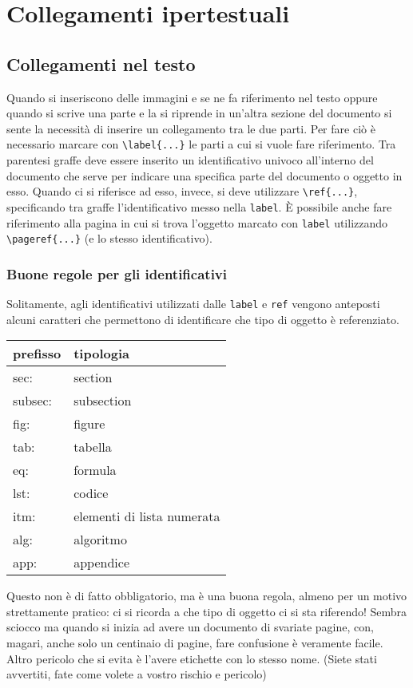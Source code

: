 \section{Collegamenti ipertestuali}

\subsection{Collegamenti nel testo}
Quando si inseriscono delle immagini e se ne fa riferimento nel testo oppure 
quando si scrive una parte e la si riprende in un'altra sezione del documento 
si sente la necessità di inserire un collegamento tra le due parti. Per fare 
ciò è necessario marcare con \verb!\label{...}! le parti a cui si vuole fare 
riferimento. Tra parentesi graffe deve essere inserito un identificativo 
univoco all'interno del documento che serve per indicare una specifica parte 
del documento o oggetto in esso. Quando ci si riferisce ad esso, invece, si 
deve utilizzare \verb!\ref{...}!, specificando tra graffe l'identificativo 
messo nella \verb!label!. È possibile anche fare riferimento alla pagina in 
cui si trova l'oggetto marcato con \verb!label! utilizzando 
\verb!\pageref{...}! (e lo stesso identificativo).

\subsubsection{Buone regole per gli identificativi}
Solitamente, agli identificativi utilizzati dalle \verb!label! e \verb!ref! 
vengono anteposti alcuni caratteri che permettono di identificare che tipo di 
oggetto è referenziato. 
\begin{table}[]
\centering
\begin{tabular}{ll}
\hline
\textbf{prefisso} & \textbf{tipologia}         \\ \hline
sec:              & section                    \\ \hline
subsec:           & subsection                 \\ \hline
fig:              & figure                     \\ \hline
tab:              & tabella                    \\ \hline
eq:               & formula                    \\ \hline
lst:              & codice                     \\ \hline
itm:              & elementi di lista numerata \\ \hline
alg:              & algoritmo                  \\ \hline
app:              & appendice                  \\ \hline
\end{tabular}
\end{table}
Questo non è di fatto obbligatorio, ma è una buona regola, almeno per un motivo 
strettamente pratico: ci si ricorda a che tipo di oggetto ci si sta riferendo! 
Sembra sciocco ma quando si inizia ad avere un documento di svariate pagine, 
con, magari, anche solo un centinaio di pagine, fare confusione è veramente 
facile. Altro pericolo che si evita è l'avere etichette con lo stesso nome. 
(Siete stati avvertiti, fate come volete a vostro rischio e pericolo)


